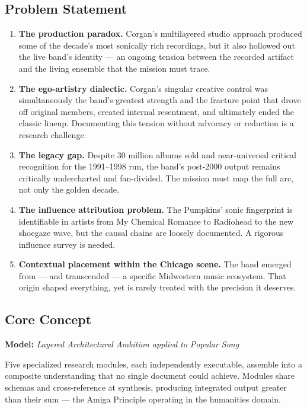 \documentclass[11pt,letterpaper]{article}
\begin{document}
\subsection{Problem Statement}

\begin{enumerate}
  \item \textbf{The production paradox.} Corgan's multilayered studio approach produced some of the decade's most sonically rich recordings, but it also hollowed out the live band's identity --- an ongoing tension between the recorded artifact and the living ensemble that the mission must trace.
  \item \textbf{The ego-artistry dialectic.} Corgan's singular creative control was simultaneously the band's greatest strength and the fracture point that drove off original members, created internal resentment, and ultimately ended the classic lineup. Documenting this tension without advocacy or reduction is a research challenge.
  \item \textbf{The legacy gap.} Despite 30 million albums sold and near-universal critical recognition for the 1991--1998 run, the band's post-2000 output remains critically undercharted and fan-divided. The mission must map the full arc, not only the golden decade.
  \item \textbf{The influence attribution problem.} The Pumpkins' sonic fingerprint is identifiable in artists from My Chemical Romance to Radiohead to the new shoegaze wave, but the causal chains are loosely documented. A rigorous influence survey is needed.
  \item \textbf{Contextual placement within the Chicago scene.} The band emerged from --- and transcended --- a specific Midwestern music ecosystem. That origin shaped everything, yet is rarely treated with the precision it deserves.
\end{enumerate}

\subsection{Core Concept}

\textbf{Model:} \textit{Layered Architectural Ambition applied to Popular Song}

Five specialized research modules, each independently executable, assemble into a composite understanding that no single document could achieve. Modules share schemas and cross-reference at synthesis, producing integrated output greater than their sum --- the Amiga Principle operating in the humanities domain.
\end{document}
